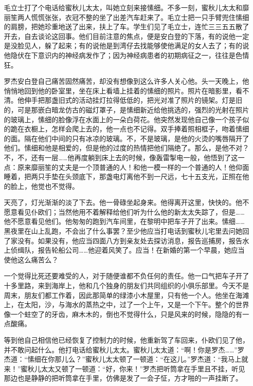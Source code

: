 \par 毛立士打了个电话给蜜秋儿太太，叫她立刻来接愫细。不多一刻，蜜秋儿太太和靡丽笙两人慌慌张张，衣冠不整的坐了出差汽车赶来了。毛立士把一只手臂兜住愫细的肩膀，把她珍重地送了出来，扶上了车。学生们见了毛立士，连忙三三五五散了开去，自去谈论这回事。他们目前注意的焦点，便是安白登的下落，有的说他一定是没脸见人，躲了起来；有的说他是到湾仔去找能够使他满足的女人去了；有的说他隐伏在下意识内的神经病发作了；因为神经病患者的初期病征之一，往往是色情狂。
\par 罗杰安白登自己痛苦固然痛苦，却没有想像到这么许多人关心他。头一天晚上，他悄悄地回到他的卧室里，坐在床上看墙上挂着的愫细的照片。照片在暗影里，看不清。他伸手把那盏旧式的活动挂灯拉得低低的，把光对准了照片的镜架。灯是旧的，可是那嵌白暗龙仿古的磁灯罩子，是愫细新近给他挑选的，强烈的光射在照片的玻璃上，愫细的脸像浮在水面上的一朵白荷花。他突然发现他自己像一个孩子似的跪在衣橱上，怎样会爬上去的，他一点也不记得。双手捧着照相框子，吻着愫细的面。隔在他们中间的只有冰凉的玻璃。不，不是玻璃，是他的火烫的嘴唇隔开了他们。愫细和他是相爱的，但是他的过度的热情把他们隔绝了。那么，是他不对？不，不，还有一层……他再度躺到床上去的时候，像轰雷掣电一般，他悟到了这一点：原来靡丽笙的丈夫是一个顶普通的人！和他一模一样的一个普通的人！他仰面睡着，把两只手垫在头颈底下，那盏电灯离他不到一尺远，七十五支光，正照在他的脸上，他觉也不觉得。
\par 天亮了，灯光渐渐的淡了下去。他一骨碌坐起身来。他得离开这里，快快的。他不愿意看见仆欧们；当然他用不着解释给他们听为什么他的新太太失踪了，但是……他不愿意看见他们。他匆匆的跑到汽车间里，在黎明中把车子开了出来。愫细……黑夜里在山上乱跑，不会出了什么事罢？至少他应当打电话到蜜秋儿宅里去问她回了家没有。如果没有，他应当四面八方到亲友处去探访消息，报告巡捕房，报告水上侦缉队，报告轮船公司……他迎着风笑了。应当！在新婚的第一个早晨，她应当使他这么痛苦么？
\par 一个觉得比死还要难受的人，对于随便谁都不负任何的责任。他一口气把车子开了十多里路，来到海岸上，他和几个独身的朋友们共同组织的小俱乐部里。今天不是周末，朋友们都工作着，因此那简单的绿漆小木屋里，只有他一个人。他坐在海滩上，在太阳，沙，与海水的蒸热之中，过了一个上午，又是一个下午。整个的世界像一个蛀空了的牙齿，麻木木的，倒也不觉得什么，只是风来的时候，隐隐的有一点酸痛。
\par 等到他自己相信他已经恢复了控制力的时候，他重新驾了车回来，仆欧们见了他，并不敢问起什么。他打电话给蜜秋儿太太。蜜秋儿太太道：“啊！你是罗杰……”罗杰道：“愫细在你那儿么？”蜜秋儿太太顿了一顿道：“在这儿。”罗杰道：“我马上就来！”蜜秋儿太太又顿了一顿道：“好，你来！”罗杰把听筒拿在手里且不挂，听见那边也是静静的把听筒拿在手里，仿佛是发了一会子怔，方才啪的一声挂断了。
